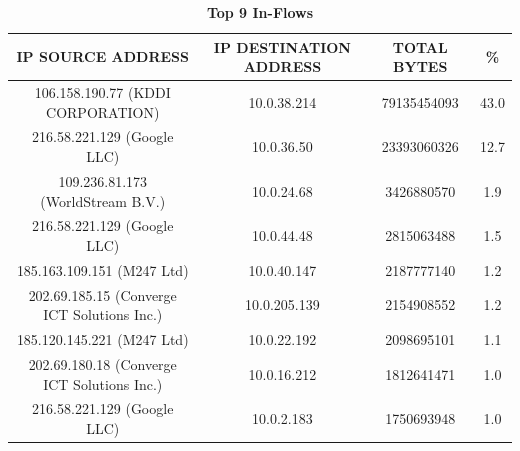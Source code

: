 \documentclass[journal]{IEEE/IEEEtran}
\begin{document}
\begin{table}[ht]
\centering
\caption{\textbf{Top 9 In-Flows}}
\label{top-out-flows}
\begin{tabular}{|c|c|c|c|}
\hline
\textbf{IP SOURCE ADDRESS} 						& \textbf{IP DESTINATION ADDRESS}	& \textbf{TOTAL BYTES} 	& \textbf{\%} \\ \hline
    106.158.190.77 (KDDI CORPORATION)			& 10.0.38.214						&  79135454093			& 43.0        \\ \hline
    216.58.221.129 (Google LLC)					& 10.0.36.50						&  23393060326          & 12.7        \\ \hline
    109.236.81.173 (WorldStream B.V.)			& 10.0.24.68						&  3426880570           & 1.9         \\ \hline
    216.58.221.129 (Google LLC)					& 10.0.44.48						&  2815063488           & 1.5         \\ \hline
    185.163.109.151 (M247 Ltd)					& 10.0.40.147						&  2187777140           & 1.2         \\ \hline
    202.69.185.15 (Converge ICT Solutions Inc.)	& 10.0.205.139						&  2154908552			& 1.2         \\ \hline
    185.120.145.221 (M247 Ltd)					& 10.0.22.192						&  2098695101           & 1.1         \\ \hline
    202.69.180.18 (Converge ICT Solutions Inc.)	& 10.0.16.212						&  1812641471           & 1.0         \\ \hline
    216.58.221.129 (Google LLC)					& 10.0.2.183						&  1750693948           & 1.0         \\ \hline
\end{tabular}
\end{table}
\end{document}
